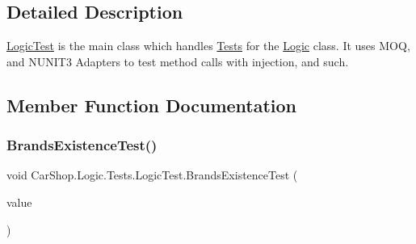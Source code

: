 \subsection{Detailed Description}
\mbox{\hyperlink{class_car_shop_1_1_logic_1_1_tests_1_1_logic_test}{Logic\+Test}} is the main class which handles \mbox{\hyperlink{namespace_car_shop_1_1_logic_1_1_tests}{Tests}} for the \mbox{\hyperlink{class_car_shop_1_1_logic_1_1_logic}{Logic}} class. It uses M\+OQ, and N\+U\+N\+I\+T3 Adapters to test method calls with injection, and such. 



\subsection{Member Function Documentation}
\mbox{\label{class_car_shop_1_1_logic_1_1_tests_1_1_logic_test_a545b9aabfa60fc520d1b05e588619560}} 
\subsubsection{\texorpdfstring{Brands\+Existence\+Test()}{BrandsExistenceTest()}}
{\footnotesize\ttfamily void Car\+Shop.\+Logic.\+Tests.\+Logic\+Test.\+Brands\+Existence\+Test (\begin{DoxyParamCaption}\item[{\mbox{[}\+Values(1, 2, 3, 4, 5, 6, 7, 8, 9, 10, 11, 12, 13, 14, 15, 16, 17, 18, 19, 20, 21, 22, 23, 24, 25, 26, 27, 28, 29, 30, 31, 32, 33, 34, 35, 36, 37, 38, 39, 40, 41, 42, 43, 44, 45, 46, 47, 48, 49, 50, 51, 52, 53, 54, 55, 56, 57, 58, 59, 60, 61, 62, 63, 64, 65, 66, 67, 68, 69, 70, 71, 72, 73, 74, 75, 76, 77, 78, 79, 80, 81, 82, 83, 84, 85, 86, 87, 88, 89, 90, 91, 92, 93, 94, 95, 96, 97, 98, 99, 100, 101, 102, 103, 104, 105, 106, 107, 108, 109, 110, 111, 112, 113, 114, 115, 116, 117, 118, 119, 120, 121, 122, 123, 124, 125, 126, 127, 128, 129, 130, 131, 132, 133, 134, 135, 136, 137, 138, 139, 140, 141, 142, 143, 144, 145, 146, 147, 148, 149, 150, 151, 152, 153, 154, 155, 156, 157, 158, 159, 160, 161, 162, 163, 164, 165, 166, 167, 168, 169, 170, 171, 172, 173, 174, 175, 176, 177, 178, 179, 180, 181, 182, 183, 184, 185, 186, 187, 188, 189, 190, 191, 192, 193, 194, 195, 196, 197, 198, 199, 200, 201, 202, 203, 204, 205, 206, 207, 208, 209, 210, 211, 212, 213, 214, 215, 216, 217, 218, 219, 220, 221)\mbox{]} int}]{value }\end{DoxyParamCaption})}



